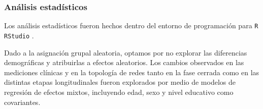 \subsubsection{Análisis estadísticos}
Los análisis estadísticos fueron hechos dentro del entorno de programación para \texttt{R} \texttt{RStudio} \parencite{Rstudio2018}.\par
Dado a la asignación grupal aleatoria, optamos por no explorar las diferencias demográficas y atribuirlas a efectos aleatorios. Los cambios observados en las mediciones clínicas y en la topología de redes tanto en la fase cerrada como en las distintas etapas longitudinales fueron explorados por medio de modelos de regresión de efectos mixtos, incluyendo edad, sexo y nivel educativo como covariantes.
